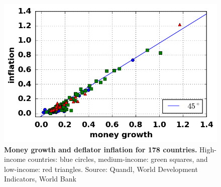 \begin{figure}[h]
\caption{\label{fig_moneyInflation} \textbf{Money growth and deflator inflation for 178 countries.} High-income countries: blue circles, medium-income: green squares, and low-income: red triangles. {\tiny Source: Quandl, World Development Indicators, World Bank}}
\hspace*{-.5cm}\includegraphics[height = 7.cm]{fig_moneyInflation.png}
\end{figure}